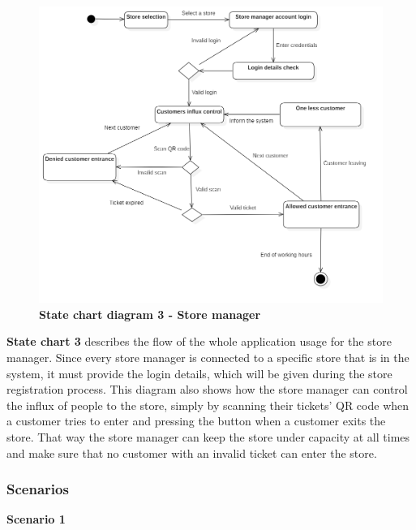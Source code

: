 \newpage

\begin{figure}[!htb]
\centering
\includegraphics[width=\textwidth]{Images/StatechartDiagram3_StoreManager}
\caption{\label{fig:statechart3}\textbf{State chart diagram 3 - Store manager}}
\end{figure}

\hspace{\parindent}\textbf{State chart 3} describes the flow of the whole application usage for the store manager. Since every store manager is connected to a specific store that is in the system, it must provide the login details, which will be given during the store registration process. This diagram also shows how the store manager can control the influx of people to the store, simply by scanning their tickets' QR code when a customer tries to enter and pressing the button when a customer exits the store. That way the store manager can keep the store under capacity at all times and make sure that no customer with an invalid ticket can enter the store.

\newpage

\subsubsection{Scenarios}

\textbf{Scenario 1}

